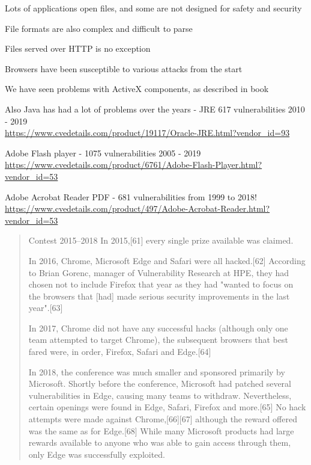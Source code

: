 \documentclass[Screen16to9,17pt]{foils}
\begin{document}
\begin{list2}
\item Lots of applications open files, and some are not designed for safety and security
\item File formats are also complex and difficult to parse
\item Files served over HTTP is no exception
\item Browsers have been susceptible to various attacks from the start
\item We have seen problems with ActiveX components, as described in book
\item Also Java has had a lot of problems over the years - JRE 617 vulnerabilities 2010 - 2019\\
\url{https://www.cvedetails.com/product/19117/Oracle-JRE.html?vendor_id=93}
\item Adobe Flash player - 1075 vulnerabilities 2005 - 2019\\
\url{https://www.cvedetails.com/product/6761/Adobe-Flash-Player.html?vendor_id=53}
\item Adobe Acrobat Reader PDF - 681 vulnerabilities from 1999 to 2018!\\ \url{https://www.cvedetails.com/product/497/Adobe-Acrobat-Reader.html?vendor_id=53}
\end{list2}


\begin{quote}
Contest 2015–2018
In 2015,[61] every single prize available was claimed.

In 2016, Chrome, Microsoft Edge and Safari were all hacked.[62] According to Brian Gorenc, manager of Vulnerability Research at HPE, they had chosen not to include Firefox that year as they had "wanted to focus on the browsers that [had] made serious security improvements in the last year".[63]

In 2017, Chrome did not have any successful hacks (although only one team attempted to target Chrome), the subsequent browsers that best fared were, in order, Firefox, Safari and Edge.[64]

In 2018, the conference was much smaller and sponsored primarily by Microsoft. Shortly before the conference, Microsoft had patched several vulnerabilities in Edge, causing many teams to withdraw. Nevertheless, certain openings were found in Edge, Safari, Firefox and more.[65] No hack attempts were made against Chrome,[66][67] although the reward offered was the same as for Edge.[68] While many Microsoft products had large rewards available to anyone who was able to gain access through them, only Edge was successfully exploited.
\end{quote}
\end{document}
